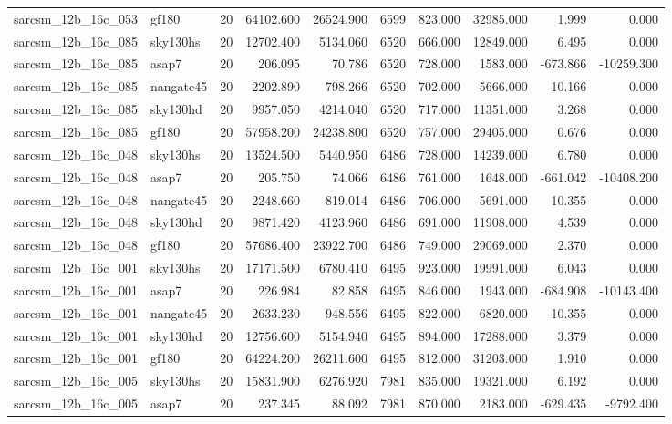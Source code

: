 \begin{longtable}{llrrrrrrrr}
sarcsm\_12b\_16c\_053 & gf180 & 20 & 64102.600 & 26524.900 & 6599 & 823.000 & 32985.000 & 1.999 & 0.000 \\
sarcsm\_12b\_16c\_085 & sky130hs & 20 & 12702.400 & 5134.060 & 6520 & 666.000 & 12849.000 & 6.495 & 0.000 \\
sarcsm\_12b\_16c\_085 & asap7 & 20 & 206.095 & 70.786 & 6520 & 728.000 & 1583.000 & -673.866 & -10259.300 \\
sarcsm\_12b\_16c\_085 & nangate45 & 20 & 2202.890 & 798.266 & 6520 & 702.000 & 5666.000 & 10.166 & 0.000 \\
sarcsm\_12b\_16c\_085 & sky130hd & 20 & 9957.050 & 4214.040 & 6520 & 717.000 & 11351.000 & 3.268 & 0.000 \\
sarcsm\_12b\_16c\_085 & gf180 & 20 & 57958.200 & 24238.800 & 6520 & 757.000 & 29405.000 & 0.676 & 0.000 \\
sarcsm\_12b\_16c\_048 & sky130hs & 20 & 13524.500 & 5440.950 & 6486 & 728.000 & 14239.000 & 6.780 & 0.000 \\
sarcsm\_12b\_16c\_048 & asap7 & 20 & 205.750 & 74.066 & 6486 & 761.000 & 1648.000 & -661.042 & -10408.200 \\
sarcsm\_12b\_16c\_048 & nangate45 & 20 & 2248.660 & 819.014 & 6486 & 706.000 & 5691.000 & 10.355 & 0.000 \\
sarcsm\_12b\_16c\_048 & sky130hd & 20 & 9871.420 & 4123.960 & 6486 & 691.000 & 11908.000 & 4.539 & 0.000 \\
sarcsm\_12b\_16c\_048 & gf180 & 20 & 57686.400 & 23922.700 & 6486 & 749.000 & 29069.000 & 2.370 & 0.000 \\
sarcsm\_12b\_16c\_001 & sky130hs & 20 & 17171.500 & 6780.410 & 6495 & 923.000 & 19991.000 & 6.043 & 0.000 \\
sarcsm\_12b\_16c\_001 & asap7 & 20 & 226.984 & 82.858 & 6495 & 846.000 & 1943.000 & -684.908 & -10143.400 \\
sarcsm\_12b\_16c\_001 & nangate45 & 20 & 2633.230 & 948.556 & 6495 & 822.000 & 6820.000 & 10.355 & 0.000 \\
sarcsm\_12b\_16c\_001 & sky130hd & 20 & 12756.600 & 5154.940 & 6495 & 894.000 & 17288.000 & 3.379 & 0.000 \\
sarcsm\_12b\_16c\_001 & gf180 & 20 & 64224.200 & 26211.600 & 6495 & 812.000 & 31203.000 & 1.910 & 0.000 \\
sarcsm\_12b\_16c\_005 & sky130hs & 20 & 15831.900 & 6276.920 & 7981 & 835.000 & 19321.000 & 6.192 & 0.000 \\
sarcsm\_12b\_16c\_005 & asap7 & 20 & 237.345 & 88.092 & 7981 & 870.000 & 2183.000 & -629.435 & -9792.400 \\

\end{longtable}
